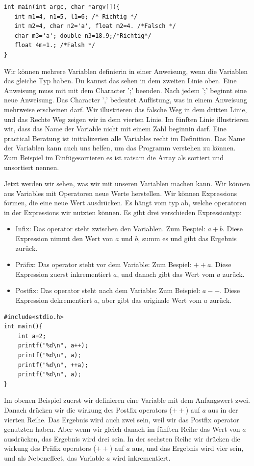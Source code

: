 \documentclass{article}[12pt]
\begin{document}
\begin{lstlisting}
int main(int argc, char *argv[]){
   int m1=4, n1=5, l1=6; /* Richtig */
   int m2=4, char n2='a', float m2=4. /*Falsch */
   char m3='a'; double n3=18.9;/*Richtig*/
   float 4m=1.; /*Falsh */
}
\end{lstlisting} 

Wir können mehrere Variablen definierin in einer Anweisung, wenn die Variablen das gleiche Typ haben. Du kannst das sehen in dem zweiten Linie oben.
Eine Anweisung muss mit mit dem Character ';' beenden. Nach jedem ';' beginnt eine neue Anweisung. Das Character ',' bedeutet Auflistung, was in 
einem Anweisung mehrweise erscheinen darf. Wir illustrieren das falsche Weg in  dem dritten Linie, und das Rechte Weg zeigen wir in dem vierten Linie.
Im fünften Linie illustrieren wir, dass das Name der Variable nicht mit einem Zahl beginnin darf. Eine practical Beratung ist initializerien
alle Variables recht im Definition. Das Name der Variablen kann auch uns helfen, um das Programm verstehen zu können. Zum Beispiel im 
Einfügesortieren es ist ratsam die Array als sortiert und unsortiert nennen.

Jetzt werden wir sehen, was wir mit unseren Variablen machen kann. Wir können aus Variables mit Operatoren neue Werte herstellen.
Wir können Expressions formen, die eine neue Wert ausdrücken. Es hängt vom typ ab, welche operatoren in der Expressions wir nutzten können.
Es gibt drei verschieden Expressiontyp:
\begin{itemize}
\item Infix: Das operator steht zwischen den Variablen. Zum Bespiel: $a+b$. Diese Expression nimmt den Wert von $a$ und $b$, summ es und gibt das Ergebnis zurück.
\item Präfix: Das operator steht vor dem Variable: Zum Bespiel: $++a$. Diese Expression zuerst inkrementiert $a$, und danach gibt das Wert vom $a$ zurück.
\item Postfix: Das operator steht nach dem Variable: Zum Beispiel: $a--$. Diese Expression dekrementiert $a$, aber gibt das originale Wert vom $a$ zurück.
\end{itemize}
\begin{lstlisting}
#include<stdio.h>
int main(){
    int a=2;
    printf("%d\n", a++);
    printf("%d\n", a);
    printf("%d\n", ++a);
    printf("%d\n", a);
}
\end{lstlisting}
Im obenen Beispiel zuerst wir definieren eine Variable mit dem Anfangswert zwei. Danach drücken wir die wirkung des Postfix operators ($++$) auf $a$ aus 
in der vierten Reihe. Das Ergebnis wird auch zwei sein, weil wir das Postfix operator genutzten haben. Aber wenn wir gleich danach im fünften Reihe
das Wert von $a$ ausdrücken, das Ergebnis wird drei sein. In der sechsten Reihe wir drücken die wirkung des Präfix operators ($++$) auf $a$ aus, und 
das Ergebnis wird vier sein, und als Nebeneffect, das Variable $a$ wird inkrementiert.
\end{document}

